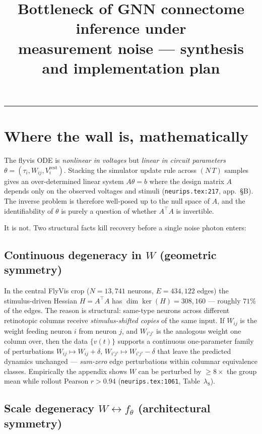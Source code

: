 \documentclass[11pt]{article}
\title{Bottleneck of GNN connectome inference under \\ measurement noise --- synthesis and implementation plan}
\author{}
\date{}
\begin{document}
\maketitle

\tableofcontents
\bigskip\hrule\bigskip

\section{Where the wall is, mathematically}

The flyvis ODE is \emph{nonlinear in voltages} but \emph{linear in circuit
parameters} $\theta = (\tau_i, W_{ij}, V^{\text{rest}}_i)$. Stacking
the simulator update rule across $(N\,T)$ samples gives an over-determined
linear system $A\theta = b$ where the design matrix $A$ depends only on the
observed voltages and stimuli (\texttt{neurips.tex:217}, app.\ \S B). The
inverse problem is therefore well-posed up to the null space of $A$, and the
identifiability of $\theta$ is purely a question of whether $A^\top A$ is
invertible.

It is not. Two structural facts kill recovery before a single noise photon
enters:

\subsection{Continuous degeneracy in $W$ (geometric symmetry)}

In the central FlyVis crop ($N{=}13{,}741$ neurons, $E{=}434{,}122$ edges) the
stimulus-driven Hessian $H = A^\top A$ has $\dim\ker(H) = 308{,}160$ ---
roughly $71\%$ of the edges. The reason is structural: same-type neurons
across different retinotopic columns receive \emph{stimulus-shifted copies}
of the same input. If $W_{ij}$ is the weight feeding neuron $i$ from neuron
$j$, and $W_{i'j'}$ is the analogous weight one column over, then the data
$\{v(t)\}$ supports a continuous one-parameter family of perturbations
$W_{ij} \mapsto W_{ij} + \delta$, $W_{i'j'} \mapsto W_{i'j'} - \delta$ that
leave the predicted dynamics unchanged --- \emph{sum-zero} edge perturbations
within columnar equivalence classes. Empirically the appendix shows $W$ can
be perturbed by $\geq 8\times$ the group mean while rollout Pearson $r > 0.94$
(\texttt{neurips.tex:1061}, Table~$\lambda_8$).

\subsection{Scale degeneracy $W \leftrightarrow f_\theta$ (architectural symmetry)}
\end{document}
